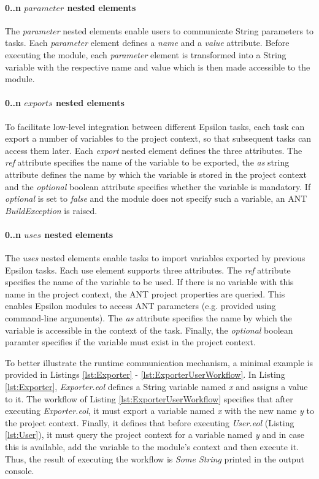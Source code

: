 \paragraph{0..n $parameter$ nested elements}

The \emph{parameter} nested elements enable users to communicate String parameters to tasks. Each \emph{parameter} element defines a \emph{name} and a \emph{value} attribute. Before executing the module, each \emph{parameter} element is transformed into a String variable with the respective name and value which is then made accessible to the module.

\paragraph{0..n $exports$ nested elements}

To facilitate low-level integration between different Epsilon tasks, each task can export a number of variables to the project context, so that subsequent tasks can access them later. Each \emph{export} nested element defines the three attributes. The \emph{ref} attribute specifies the name of the variable to be exported, the \emph{as} string attribute defines the name by which the variable is stored in the project context and the \emph{optional} boolean attribute specifies whether the variable is mandatory. If \emph{optional} is set to \emph{false} and the module does not specify such a variable, an ANT \emph{BuildException} is raised.

\paragraph{0..n $uses$ nested elements}

The \emph{uses} nested elements enable tasks to import variables exported by previous Epsilon tasks. Each use element supports three attributes. The \emph{ref} attribute specifies the name of the variable to be used. If there is no variable with this name in the project context, the ANT project properties are queried. This enables Epsilon modules to access ANT parameters (e.g. provided using command-line arguments). The \emph{as} attribute specifies the name by which the variable is accessible in the context of the task. Finally, the \emph{optional} boolean paramter specifies if the variable must exist in the project context.

To better illustrate the runtime communication mechanism, a minimal example is provided in Listings \ref{lst:Exporter} - \ref{lst:ExporterUserWorkflow}. In Listing \ref{lst:Exporter}, \emph{Exporter.eol} defines a String variable named \emph{x} and assigns a value to it. The workflow of Listing \ref{lst:ExporterUserWorkflow} specifies that after executing \emph{Exporter.eol}, it must export a variable named \emph{x} with the new name \emph{y} to the project context. Finally, it defines that before executing \emph{User.eol} (Listing \ref{lst:User}), it must query the project context for a variable named \emph{y} and in case this is available, add the variable to the module's context and then execute it. Thus, the result of executing the workflow is \emph{Some String} printed in the output console.

